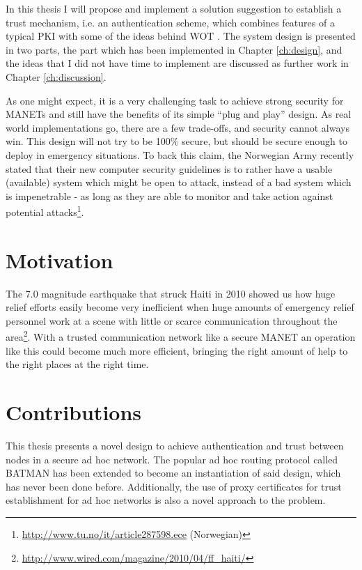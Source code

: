 In this thesis I will propose and implement a solution suggestion to establish a
trust mechanism, i.e. an authentication scheme, which combines features of a
typical \ac{PKI} with some of the ideas behind \ac{WOT}
\cite{zimmermann1995official}. The system design is presented in two parts, the
part which has been implemented in Chapter \ref{ch:design}, and the ideas that I
did not have time to implement are discussed as further work in Chapter
\ref{ch:discussion}.

As one might expect, it is a very challenging task to achieve strong security
for \acp{MANET} and still have the benefits of its simple ``plug and play''
design. As real world implementations go, there are a few trade-offs, and
security cannot always win. This design will not try to be 100\% secure, but
should be secure enough to deploy in emergency situations. To back this claim,
the Norwegian Army recently stated that their new computer security guidelines
is to rather have a usable (available) system which might be open to attack,
instead of a bad system which is impenetrable - as long as they are able to
monitor and take action against potential
attacks\footnote{\url{http://www.tu.no/it/article287598.ece} (Norwegian)}.

\section{Motivation}
The 7.0 magnitude earthquake that struck Haiti in 2010 showed us how huge
relief efforts easily become very inefficient when huge amounts of emergency
relief personnel work at a scene with little or scarce communication throughout
the area\footnote{\url{http://www.wired.com/magazine/2010/04/ff_haiti/}}. With
a trusted communication network like a secure \ac{MANET} an operation like this
could become much more efficient, bringing the right amount of help to the
right places at the right time.

\section{Contributions}
This thesis presents a novel design to achieve authentication and trust
between nodes in a secure ad hoc network. The popular ad hoc routing protocol
called BATMAN has been extended to become an instantiation of said design, which
has never been done before. Additionally, the use of proxy certificates for
trust establishment for ad hoc networks is also a novel approach to the problem.

